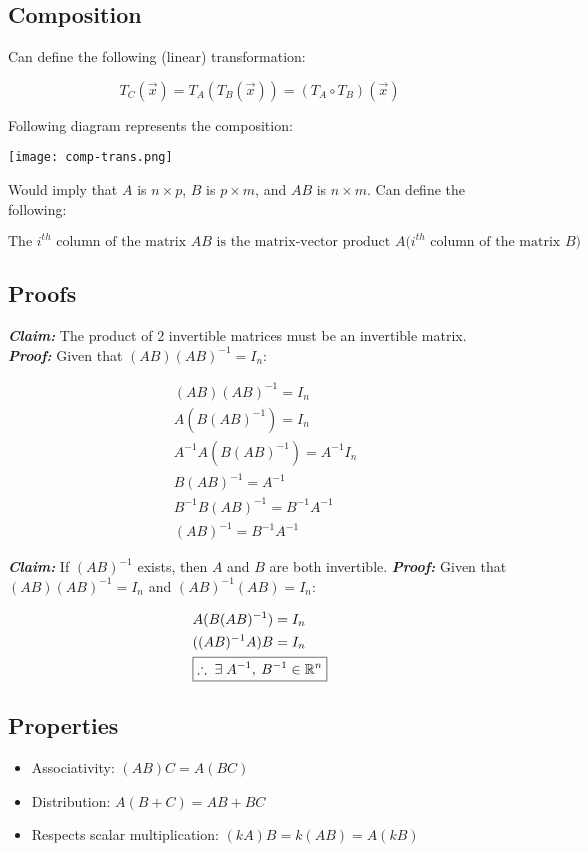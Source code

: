 \subsection{Composition}

Can define the following (linear) transformation:

\[\boxed{T_C(\vec{x})=T_A(T_B(\vec{x}))=(T_A\circ T_B)(\vec{x})}\]

Following diagram represents the composition:

\begin{center}
    \texttt{[image: comp-trans.png]}
\end{center}

Would imply that $A$ is $n\times p$, $B$ is $p\times m$, and $AB$ is $n\times m$.
Can define the following:

\[\boxed{\text{The $i^{th}$ column of the matrix $AB$ is the matrix-vector product $A$($i^{th}$ column of the matrix $B$)}}\]

\subsection{Proofs}

\textbf{\textit{Claim:}} The product of 2 invertible matrices must be an invertible matrix.\newline
\textbf{\textit{Proof:}} Given that $(AB)(AB)^{-1}=I_n$:

\begin{align*}
    &(AB)(AB)^{-1}=I_n\\
    &A(B(AB)^{-1})=I_n\\
    &A^{-1}A(B(AB)^{-1})=A^{-1}I_n\\ 
    &B(AB)^{-1}=A^{-1}\\ 
    &B^{-1}B(AB)^{-1}=B^{-1}A^{-1}\\
    &(AB)^{-1}=B^{-1}A^{-1}
\end{align*}

\noindent\textbf{\textit{Claim:}} If $(AB)^{-1}$ exists, then $A$ and $B$ are both invertible.\newline
\textbf{\textit{Proof:}} Given that $(AB)(AB)^{-1}=I_n$ and $(AB)^{-1}(AB)=I_n$:

\begin{align*}
    &A(B(AB)^{-1})=I_n\\ 
    &((AB)^{-1}A)B=I_n\\
    &\boxed{\therefore\;\exists\;A^{-1},\:B^{-1}\in \mathbb{R}^n}
\end{align*}

\subsection{Properties}

\begin{itemize}
    \item Associativity: $(AB)C=A(BC)$
    \item Distribution: $A(B+C)=AB+BC$
    \item Respects scalar multiplication: $(kA)B=k(AB)=A(kB)$ 
\end{itemize}
